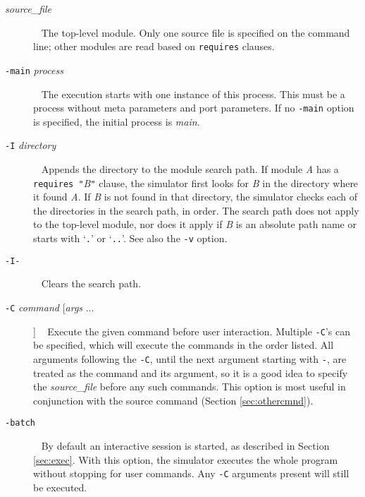 \begin{description}
\item[{\it{}source\_file}] \ \linebreak
The top-level module. Only one source file is
specified on the command line; other modules are read based on \verb|requires|
clauses.

\item[{\tt{}-main} {\it{}process}] \ \linebreak
The execution starts with one instance of this
process. This must be a process without meta parameters and port parameters.
If no \verb|-main| option is specified, the initial process is {\it{}main}.

\item[{\tt{}-I} {\it{}directory}] \ \linebreak
Appends the directory to the module search path.
If module {\it{}A} has a \verb|requires "|{\it{}B}\verb|"| clause, the simulator first looks for
{\it{}B} in the directory where it found {\it{}A}. If {\it{}B} is not found in that
directory, the simulator checks each of the directories in the search
path, in order. The search path does not apply to the top-level module,
nor does it apply if {\it{}B} is an absolute path name or starts with `\verb|.|' or
`\verb|..|'. See also the \verb|-v| option.

\item[{\tt{}-I-}] \ \linebreak
Clears the search path.

\item[{\tt{}-C} {\it{}command} [{\it{}args} ...]] \ \linebreak
Execute the given command before user
interaction.  Multiple \verb|-C|'s can be specified, which will execute the commands
in the order listed.  All arguments following the \verb|-C|, until the next
argument starting with \verb|-|, are treated as the command and its argument, so it
is a good idea to specify the {\it{}source\_file} before any such commands.
This option is most useful in conjunction with the source command
(Section \ref{sec:othercmnd}).

\item[{\tt{}-batch}] \ \linebreak
By default an interactive session is started, as described
in Section \ref{sec:exec}. With this option, the simulator executes the whole
program without stopping for user commands.  Any \verb|-C| arguments present
will still be executed.


\end{description}
